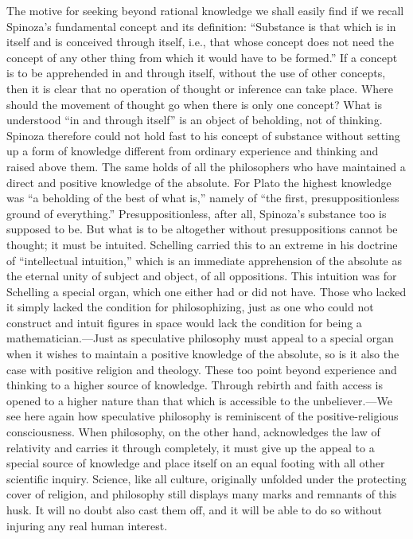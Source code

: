 \documentclass[12pt]{book}
\newcommand{\opage}[1]{\marginnote{\footnotesize\textit{[#1]}}}
\begin{document}
The motive for seeking beyond rational knowledge we shall easily find if we recall
Spinoza's fundamental concept and its definition: ``Substance is that which is in
itself and is conceived through itself, i.e., that whose concept does not need the
concept of any other thing from which it would have to be formed.'' If a concept is to
be apprehended in and through itself, without the use of other concepts, then it is
clear that no operation of thought or inference can take place. Where should the
movement of thought go when there is only one concept? What is understood ``in and
through itself'' is an object of beholding, not of thinking. Spinoza therefore could not
hold fast to his concept of substance without setting up a form of knowledge different
from ordinary experience and thinking and raised above them. The same holds of all the
philosophers who have maintained a direct and positive knowledge of the absolute. For
Plato the highest knowledge was ``a beholding of the best of what is,'' namely of ``the
first, presuppositionless ground of everything.'' Presuppositionless, after all,
Spinoza's substance too is supposed to be. But what is to be altogether without
presuppositions cannot be thought; it must be intuited. Schelling carried this to an
extreme in \opage{114}his doctrine of ``intellectual intuition,'' which is an immediate
apprehension of the absolute as the eternal unity of subject and object, of all
oppositions. This intuition was for Schelling a special organ, which one either had or
did not have. Those who lacked it simply lacked the condition for philosophizing, just
as one who could not construct and intuit figures in space would lack the condition for
being a mathematician.---Just as speculative philosophy must appeal to a special organ
when it wishes to maintain a positive knowledge of the absolute, so is it also the case
with positive religion and theology. These too point beyond experience and thinking to a
higher source of knowledge. Through rebirth and faith access is opened to a higher
nature than that which is accessible to the unbeliever.---We see here again how
speculative philosophy is reminiscent of the positive-religious consciousness. When
philosophy, on the other hand, acknowledges the law of relativity and carries it through
completely, it must give up the appeal to a special source of knowledge and place itself
on an equal footing with all other scientific inquiry. Science, like all culture,
originally unfolded under the protecting cover of religion, and philosophy still
displays many marks and remnants of this husk. It will no doubt also cast them off, and
it will be able to do so without injuring any real human interest.
\end{document}
